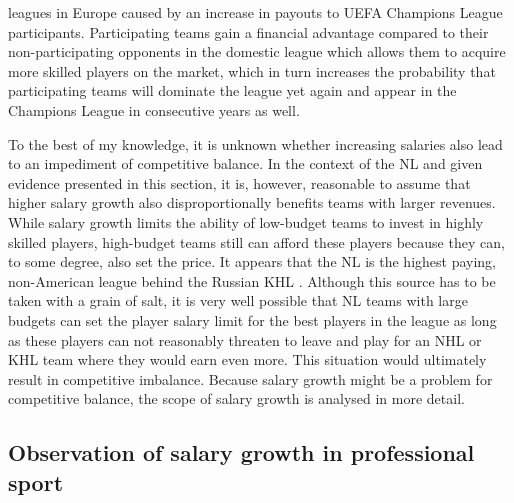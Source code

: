 \documentclass[12pt,a4paper]{article}\usepackage[]{graphicx}\usepackage[]{xcolor}
\begin{document}
leagues in Europe caused by an increase in payouts to UEFA Champions League participants. Participating teams gain a financial advantage compared to their non-participating opponents in the domestic league which allows them to acquire more skilled players on the market, which in turn increases the probability that participating teams will dominate the league yet again and appear in the Champions League in consecutive years as well. 
\par
\noindent
To the best of my knowledge, it is unknown whether increasing salaries also lead to an impediment of competitive balance. In the context of the NL and given evidence presented in this section, it is, however, reasonable to assume that higher salary growth also disproportionally benefits teams with larger revenues. While salary growth limits the ability of low-budget teams to invest in highly skilled players, high-budget teams still can afford these players because they can, to some degree, also set the price. It appears that the NL is the highest paying, non-American league behind the Russian KHL \citep{darryl_wolski_2112hockey_2020_2020}. Although this source has to be taken with a grain of salt, it is very well possible that NL teams with large budgets can set the player salary limit for the best players in the league as long as these players can not reasonably threaten to leave and play for an NHL or KHL team where they would earn even more. This situation would ultimately result in competitive imbalance. Because salary growth might be a problem for competitive balance, the scope of salary growth is analysed in more detail.



\subsection{Observation of salary growth in professional sport}
\end{document}
